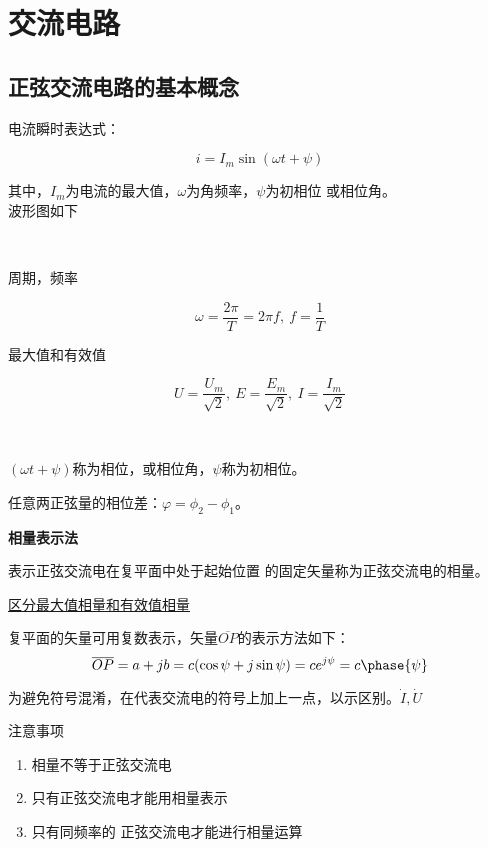 \section{交流电路}

\subsection{正弦交流电路的基本概念}

电流瞬时表达式：

\[
    i=I_m\sin(\omega t+\psi)
\]

其中，$I_m$为电流的最大值，$\omega$为角频率，$\psi$为初相位
或相位角。\\
波形图如下




\

周期，频率

\[
    \omega=\frac{2\pi}{T}=2\pi f,~ f=\frac{1}{T}    
\]

最大值和有效值

\[
    U = \frac{U_m}{\sqrt{2}} ,~ 
    E = \frac{E_m}{\sqrt{2}} ,~
    I=\frac{I_m}{\sqrt{2}}
\]

\

$(\omega t + \psi)$称为相位，或相位角，$\psi$称为初相位。

任意两正弦量的相位差：$\varphi = \phi_2 - \phi_1$。

\large{\textbf{相量表示法}}

\begin{theorem}
    表示正弦交流电在复平面中处于起始位置
的固定矢量称为正弦交流电的相量。
\end{theorem}

\underline{
区分最大值相量和有效值相量
}

复平面的矢量可用复数表示，矢量$\overline{OP}$的表示方法如下：
\[
    \overline{OP}=a+jb = c(\cos \psi + j\sin \psi ) = ce^{j\psi}=c\phase{\psi}
\]

为避免符号混淆，在代表交流电的符号上加上一点，以示区别。$\dot{I},\dot{U}$

\large 注意事项
\normalsize
\begin{enumerate}
    \item 相量不等于正弦交流电
    \item 只有正弦交流电才能用相量表示
    \item 只有同频率的
    正弦交流电才能进行相量运算
\end{enumerate}

